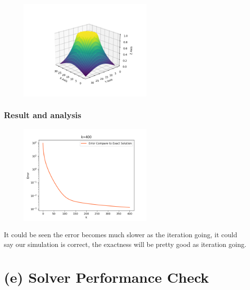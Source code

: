 \documentclass[12pt]{article}
\begin{document}
\begin{figure}[H]
    \centering
    \includegraphics[width=0.6\textwidth]{WithExactB.png}
    \label{WithExactB.png}
\end{figure}


\subsubsection{Result and analysis}



\begin{figure}[H]
    \centering
    \includegraphics[width=0.6\textwidth]{ErrorwithExact.png}
    \label{ErrorwithExact.png}
\end{figure}

It could be seen the error becomes much slower as the iteration going, it could say 
our simulation is correct, the exactness will be pretty good as iteration going.















\section{(e) Solver Performance Check}
\end{document}
